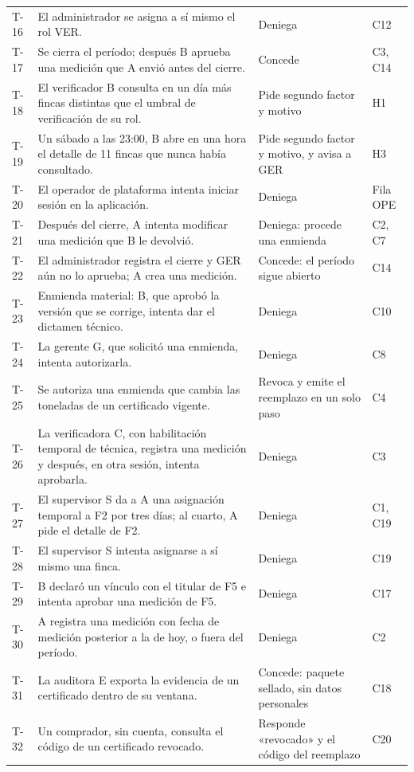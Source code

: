 \documentclass[11pt,letterpaper]{article}
\begin{document}
{\begin{longtable}{@{}L{0.9cm} L{9.5cm} L{2.9cm} L{2.2cm}@{}}
T-16 & El administrador se asigna a sí mismo el rol VER. & Deniega & C12 \\
T-17 & Se cierra el período; después B aprueba una medición que A envió antes del cierre. & Concede & C3, C14 \\
T-18 & El verificador B consulta en un día más fincas distintas que el umbral de verificación de su rol. & Pide segundo factor y motivo & H1 \\
T-19 & Un sábado a las 23:00, B abre en una hora el detalle de 11 fincas que nunca había consultado. & Pide segundo factor y motivo, y avisa a GER & H3 \\
T-20 & El operador de plataforma intenta iniciar sesión en la aplicación. & Deniega & Fila OPE \\
\midrule
T-21 & Después del cierre, A intenta modificar una medición que B le devolvió. & Deniega: procede una enmienda & C2, C7 \\
T-22 & El administrador registra el cierre y GER aún no lo aprueba; A crea una medición. & Concede: el período sigue abierto & C14 \\
T-23 & Enmienda material: B, que aprobó la versión que se corrige, intenta dar el dictamen técnico. & Deniega & C10 \\
T-24 & La gerente G, que solicitó una enmienda, intenta autorizarla. & Deniega & C8 \\
T-25 & Se autoriza una enmienda que cambia las toneladas de un certificado vigente. & Revoca y emite el reemplazo en un solo paso & C4 \\
T-26 & La verificadora C, con habilitación temporal de técnica, registra una medición y después, en otra sesión, intenta aprobarla. & Deniega & C3 \\
T-27 & El supervisor S da a A una asignación temporal a F2 por tres días; al cuarto, A pide el detalle de F2. & Deniega & C1, C19 \\
T-28 & El supervisor S intenta asignarse a sí mismo una finca. & Deniega & C19 \\
T-29 & B declaró un vínculo con el titular de F5 e intenta aprobar una medición de F5. & Deniega & C17 \\
T-30 & A registra una medición con fecha de medición posterior a la de hoy, o fuera del período. & Deniega & C2 \\
T-31 & La auditora E exporta la evidencia de un certificado dentro de su ventana. & Concede: paquete sellado, sin datos personales & C18 \\
T-32 & Un comprador, sin cuenta, consulta el código de un certificado revocado. & Responde «revocado» y el código del reemplazo & C20 \\

\end{longtable}}
\end{document}
